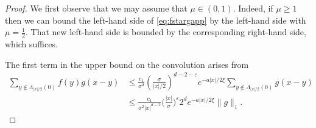 \documentclass[11pt,a4paper]{article}
\numberwithin{equation}{section}
\theoremstyle{plain}
\theoremstyle{definition}
\newcommand\1{\mathds{1}}
\begin{document}
\begin{proof}
We first observe that we may assume that $\mu\in (0,1)$.
Indeed, if $\mu \ge 1$ then we can bound the left-hand side of \eqref{eq:fstargapp}
by the left-hand side with $\mu = \frac 12$.  That new left-hand side is bounded by the corresponding right-hand side, which suffices.


The first term in the upper bound on the convolution arises from
\begin{align}
    \sum_{y \notin \Lambda_{|x|/2}(0)} f(y)g(x-y)
    & \le
    \frac{c_1}{\sigma^d}
    \left( \frac{\sigma}{ |x|/2}\right)^{d-2-\varepsilon}e^{-a|x|/2\xi} \sum_{y \notin \Lambda_{|x|/2}(0)}  g(x-y)
    \nonumber \\ & \le
\frac{c_1 }{\sigma^{2}|x|^{d-2}}\Big(\frac{|x|}{\sigma}\Big)^\varepsilon 2^d
    e^{-a|x|/2\xi}\|g\|_1.
\label{eq:fg1}
\end{align}


\end{proof}
\end{document}
